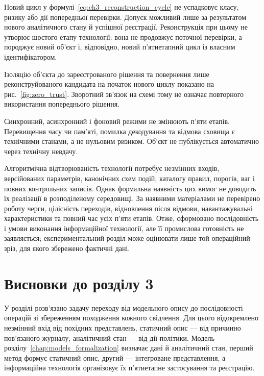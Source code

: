 Новий цикл у формулі~\eqref{eq:ch3_reconstruction_cycle} не успадковує класу, ризику або дії попередньої перевірки. Допуск можливий лише за результатом нового аналітичного стану й успішної реєстрації. Реконструкція при цьому не утворює шостого етапу технології: вона не продовжує поточної перевірки, а породжує новий об’єкт і, відповідно, новий п’ятиетапний цикл із власним ідентифікатором.

Ізоляцію об’єкта до зареєстрованого рішення та повернення лише реконструйованого кандидата на початок нового циклу показано на рис.~\ref{fig:zero_trust}. Зворотний зв’язок на схемі тому не означає повторного використання попереднього рішення.



Синхронний, асинхронний і фоновий режими не змінюють п’яти етапів. Перевищення часу чи пам’яті, помилка декодування та відмова сховища є технічними станами, а не нульовим ризиком. Об’єкт не публікується автоматично через технічну невдачу.

Алгоритмічна відтворюваність технології потребує незмінних входів, версійованих параметрів, канонічних схем подій, каталогу правил, порогів, ваг і повних контрольних записів. Однак формальна наявність цих вимог не доводить їх реалізації в розподіленому середовищі. За наявними матеріалами не перевірено роботу черги, цілісність переходів, відновлення після відмови, навантажувальні характеристики та повний час усіх п’яти етапів. Отже, сформовано послідовність і умови виконання інформаційної технології, але її промислова готовність не заявляється; експериментальний розділ може оцінювати лише той операційний зріз, для якого збережено фактичні дані.

\section*{Висновки до розділу 3}

У розділі розв’язано задачу переходу від модельного опису до послідовності операцій зі збереженням походження кожного свідчення. Для цього відокремлено незмінний вхід від похідних представлень, статичний опис --- від причинно пов’язаного журналу, аналітичний стан --- від дії політики. Модель розділу~\ref{chap:models_formalization} визначає дані й аналітичний стан, перший метод формує статичний опис, другий --- інтегроване представлення, а інформаційна технологія організовує їх п’ятиетапне застосування та реєстрацію.

